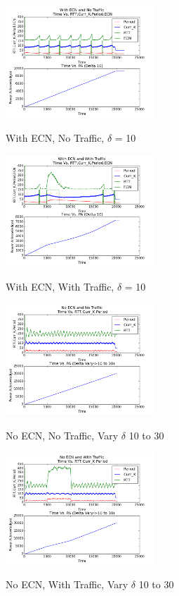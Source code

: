 \begin{figure}[htb]
  \begin{center}

    \includegraphics[width=0.50\textwidth]{Figures/iccps2014/w_ecn_no_tr_d10.png}
  \caption{With ECN, No Traffic, $\delta$ = 10}
  \label{fig:w_ecn_no_tr_d10}
    \includegraphics[width=0.50\textwidth]{Figures/iccps2014/w_ecn_w_tr_d10.png}
  \caption{With ECN, With Traffic, $\delta$ = 10}
  \label{fig:w_ecn_w_tr_d10}

  \end{center}
\end{figure}
\begin{figure}[htb]
  \begin{center}
  
    \includegraphics[width=0.50\textwidth]{Figures/iccps2014/no_ecn_no_tr_d10_30.png}
  \caption{No ECN, No Traffic, Vary $\delta$ 10 to 30}
  \label{fig:no_ecn_no_tr_d10_30}
    \includegraphics[width=0.50\textwidth]{Figures/iccps2014/no_ecn_w_tr_d10_30.png}
  \caption{No ECN, With Traffic, Vary $\delta$ 10 to 30}
  \label{fig:no_ecn_w_tr_d10_30}

  \end{center}
\end{figure}
